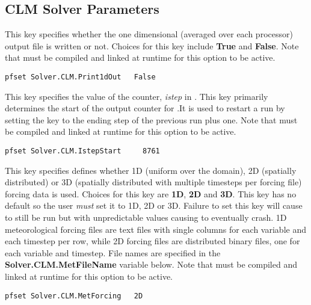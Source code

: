 \subsection{CLM Solver Parameters}
\label{CLM Solver Parameters}

{This key specifies whether the  one dimensional (averaged over each processor) output file is written or not. 
Choices for this key include {\bf True} and {\bf False}. Note that  must be compiled and linked at runtime for this option to be active.
}
\begin{display}\begin{verbatim}
pfset Solver.CLM.Print1dOut   False
\end{verbatim}\end{display}


{This key specifies the value of the counter, {\em istep} in .  This key primarily determines the start of the output counter for .It is used to restart a run by setting the key to the ending step of the previous run plus one. Note that  must be compiled and linked at runtime for this option to be active.
}
\begin{display}\begin{verbatim}
pfset Solver.CLM.IstepStart     8761      
\end{verbatim}\end{display}


{This key specifies defines whether 1D (uniform over  
the domain), 2D (spatially distributed) or 3D (spatially distributed with multiple timesteps per  forcing file) forcing data is used.  Choices for this key are {\bf 1D}, {\bf 2D} and {\bf 3D}. This key  
has no default so the user {\em must} set it to 1D, 2D or 3D. Failure to set this key will cause  to still be run but with unpredictable values causing  to eventually crash. 1D meteorological forcing files are text files with single columns for each variable and each timestep per row, while 2D forcing files are distributed \parflow{} binary files, one for each variable and timestep.  File names are specified in the {\bf Solver.CLM.MetFileName} variable below. Note that  must be compiled and linked at runtime for this option to be active.
}
\begin{display}\begin{verbatim}
pfset Solver.CLM.MetForcing   2D       
\end{verbatim}\end{display}

